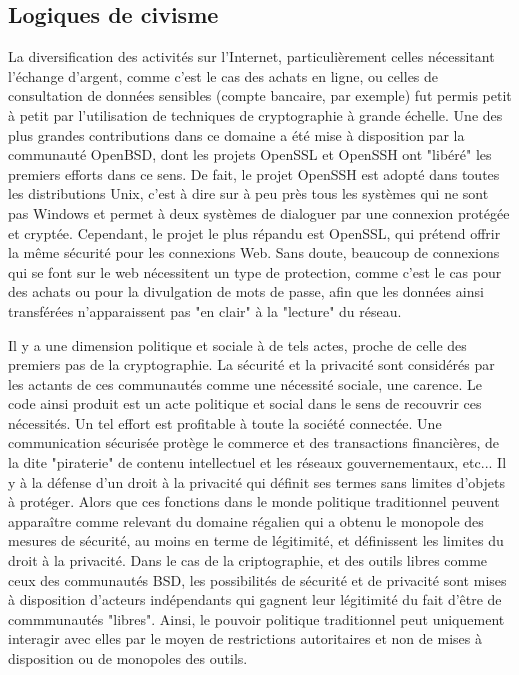\subsection{Logiques de civisme}\label{3.3.2}

La diversification des activités sur l'Internet, particulièrement celles nécessitant l'échange d'argent, comme c'est le cas des achats en ligne, ou celles de consultation de données sensibles (compte bancaire, par exemple) fut permis petit à petit par l'utilisation de techniques de cryptographie à grande échelle. Une des plus grandes contributions dans ce domaine a été mise à disposition par la communauté OpenBSD, dont les projets OpenSSL et OpenSSH ont "libéré" les premiers efforts dans ce sens. De fait, le projet OpenSSH est adopté dans toutes les distributions Unix, c'est à dire sur à peu près tous les systèmes qui ne sont pas Windows et permet à deux systèmes de dialoguer par une connexion protégée et cryptée. Cependant, le projet le plus répandu est OpenSSL, qui prétend offrir la même sécurité pour les connexions Web. Sans doute, beaucoup de connexions qui se font sur le web nécessitent un type de protection, comme c'est le cas pour des achats ou pour la divulgation de mots de passe, afin que les données ainsi transférées n'apparaissent pas "en clair" à la "lecture" du réseau.

Il y a une dimension politique et sociale à de tels actes, proche de celle des premiers pas de la cryptographie. La sécurité et la privacité sont considérés par les actants de ces communautés comme une nécessité sociale, une carence. Le code ainsi produit est un acte politique et social dans le sens de recouvrir ces nécessités. Un tel effort est profitable à toute la société connectée. Une communication sécurisée protège le commerce et des transactions financières, de la dite "piraterie" de contenu intellectuel et les réseaux gouvernementaux, etc... Il y à la défense d'un droit à la privacité qui définit ses termes sans limites d'objets à protéger. Alors que ces fonctions dans le monde politique traditionnel peuvent apparaître comme relevant du domaine régalien qui a obtenu le monopole des mesures de sécurité, au moins en terme de légitimité, et définissent les limites du droit à la privacité. Dans le cas de la criptographie, et des outils libres comme ceux des communautés BSD, les possibilités de sécurité et de privacité sont mises à disposition d'acteurs indépendants qui gagnent leur légitimité du fait d'être de commmunautés "libres". Ainsi, le pouvoir politique traditionnel peut uniquement interagir avec elles par le moyen de restrictions autoritaires et non de mises à disposition ou de monopoles des outils.


